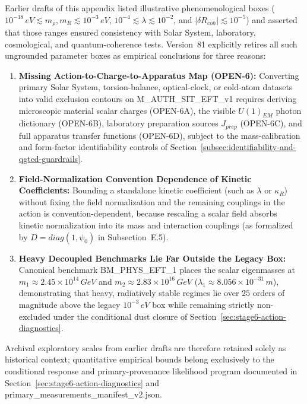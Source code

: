 \documentclass[american,11pt,letterpaper]{article}
\def\mathrm#1{#1}%
\def\texttt#1{#1}%
\def\emph#1{#1}%
\begin{document}
Earlier drafts of this appendix listed illustrative phenomenological boxes ($10^{-18}\,\mathrm{eV} \lesssim m_\rho, m_R \lesssim 10^{-3}\,\mathrm{eV}$, $10^{-4} \lesssim \lambda \lesssim 10^{-2}$, and $|\delta R_{\mathrm{coh}}| \lesssim 10^{-5}$) and asserted that those ranges ensured consistency with Solar System, laboratory, cosmological, and quantum-coherence tests. Version~81 explicitly \emph{retires} all such ungrounded parameter boxes as empirical conclusions for three reasons:
\begin{enumerate}[leftmargin=2em]
  \item \textbf{Missing Action-to-Charge-to-Apparatus Map (\texttt{OPEN-6}):} Converting primary Solar System, torsion-balance, optical-clock, or cold-atom datasets into valid exclusion contours on \texttt{M\_AUTH\_SIT\_EFT\_v1} requires deriving microscopic material scalar charges (\texttt{OPEN-6A}), the visible $U(1)_{\mathrm{EM}}$ photon dictionary (\texttt{OPEN-6B}), laboratory preparation sources $J_{\mathrm{prep}}$ (\texttt{OPEN-6C}), and full apparatus transfer functions (\texttt{OPEN-6D}), subject to the mass-calibration and form-factor identifiability controls of Section~\ref{subsec:identifiability-and-qgtcd-guardrails}.
  \item \textbf{Field-Normalization Convention Dependence of Kinetic Coefficients:} Bounding a standalone kinetic coefficient (such as $\lambda$ or $\kappa_R$) without fixing the field normalization and the remaining couplings in the action is convention-dependent, because rescaling a scalar field absorbs kinetic normalization into its mass and interaction couplings (as formalized by $D = \mathrm{diag}(1, \psi_0)$ in Subsection~E.5).
  \item \textbf{Heavy Decoupled Benchmarks Lie Far Outside the Legacy Box:} Canonical benchmark \texttt{BM\_PHYS\_EFT\_1} places the scalar eigenmasses at $m_1 \approx 2.45\times 10^{14}\,\mathrm{GeV}$ and $m_2 \approx 2.83\times 10^{16}\,\mathrm{GeV}$ ($\lambda_1 \approx 8.056\times 10^{-31}\,\mathrm{m}$), demonstrating that heavy, radiatively stable regimes lie over $25$ orders of magnitude above the legacy $10^{-3}\,\mathrm{eV}$ box while remaining strictly non-excluded under the conditional dust closure of Section~\ref{sec:stage6-action-diagnostics}.
\end{enumerate}

Archival exploratory scales from earlier drafts are therefore retained solely as historical context; quantitative empirical bounds belong exclusively to the conditional response and primary-provenance likelihood program documented in Section~\ref{sec:stage6-action-diagnostics} and \texttt{primary\_measurements\_manifest\_v2.json}.
\end{document}
